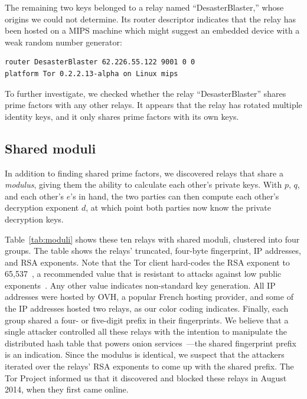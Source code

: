 The remaining two keys belonged to a relay named ``DesasterBlaster,'' whose
origins we could not determine. Its router descriptor indicates that the relay
has been hosted on a MIPS machine which might suggest an embedded device with a
weak random number generator:

\begin{verbatim}
router DesasterBlaster 62.226.55.122 9001 0 0
platform Tor 0.2.2.13-alpha on Linux mips
\end{verbatim}

To further investigate, we checked whether the relay ``DesasterBlaster'' shares
prime factors with any other relays. It appears that the relay has rotated
multiple identity keys, and it only shares prime factors with its own keys.


\subsection{Shared moduli}
\label{sec:shared-moduli}
In addition to finding shared prime factors, we discovered relays that share a
\emph{modulus}, giving them the ability to calculate each other's private keys.
With $p$, $q$, and each other's $e$'s in hand, the two parties can then compute
each other's decryption exponent $d$, at which point both parties now know the
private decryption keys.

Table~\ref{tab:moduli} shows these ten relays with shared moduli, clustered into
four groups. The table shows the relays' truncated, four-byte fingerprint, IP
addresses, and RSA exponents.  Note that the Tor client hard-codes the RSA
exponent to 65,537~\cite[\S~0.3]{torspec}, a recommended value that is resistant
to attacks against low public exponents~\cite[\S~4]{Boneh1999a}.  Any other
value indicates non-standard key generation.  All IP addresses were hosted by
OVH, a popular French hosting provider, and some of the IP addresses hosted two
relays, as our color coding indicates.  Finally, each group shared a four- or
five-digit prefix in their fingerprints.  We believe that a single attacker
controlled all these relays with the intention to manipulate the distributed
hash table that powers onion services~\cite{Biryukov2013a}---the shared
fingerprint prefix is an indication.  Since the modulus is identical, we suspect
that the attackers iterated over the relays' RSA exponents to come up with the
shared prefix.  The Tor Project informed us that it discovered and blocked these
relays in August 2014, when they first came online.


